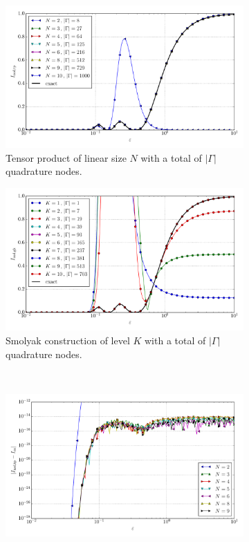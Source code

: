 \documentclass[a4paper,10pt]{article}
\begin{document}
\begin{figure}[ht!]
  \begin{subfigure}[t]{0.5\linewidth}
    \includegraphics[width=\linewidth]{./plots/tp_sg_3d_conv_eps_(2,2,2)_(2,2,2)_val_nsd_tp.pdf}
    \caption{Tensor product of linear size $N$ with a total of $|\Gamma|$ quadrature nodes.}
    \label{fig:tp_sg_3d_conv_p_222_222_val_nsd_tp}
  \end{subfigure}
  \begin{subfigure}[t]{0.5\linewidth}
    \includegraphics[width=\linewidth]{./plots/tp_sg_3d_conv_eps_(2,2,2)_(2,2,2)_val_nsd_gk.pdf}
    \caption{Smolyak construction of level $K$ with a total of $|\Gamma|$ quadrature nodes.}
    \label{fig:tp_sg_3d_conv_p_222_222_val_nsd_gk}
  \end{subfigure} \\
  \begin{subfigure}[t]{0.5\linewidth}
    \includegraphics[width=\linewidth]{./plots/tp_sg_3d_conv_eps_(2,2,2)_(2,2,2)_err_nsd_tp.pdf}

\end{subfigure}
\end{figure}
\end{document}
